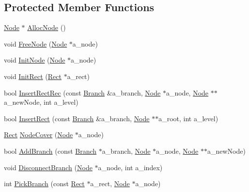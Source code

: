 \subsection*{Protected Member Functions}
\begin{DoxyCompactItemize}
\item 
\hyperlink{structRTree_1_1Node}{Node} $\ast$ \hyperlink{classRTree_af118b3fc992c88a61fb2e1ebc0c96fc9}{Alloc\-Node} ()
\item 
void \hyperlink{classRTree_a6b5438d9cb74dbfc63f3bfff275f506b}{Free\-Node} (\hyperlink{structRTree_1_1Node}{Node} $\ast$a\-\_\-node)
\item 
void \hyperlink{classRTree_aa24d93770aaa1042136daeabfdb8de3e}{Init\-Node} (\hyperlink{structRTree_1_1Node}{Node} $\ast$a\-\_\-node)
\item 
void \hyperlink{classRTree_aa065e71784e5cac81acd16c07c6abe5e}{Init\-Rect} (\hyperlink{structRTree_1_1Rect}{Rect} $\ast$a\-\_\-rect)
\item 
bool \hyperlink{classRTree_af8e10a4e616414ddf6c0ee40a6c95664}{Insert\-Rect\-Rec} (const \hyperlink{structRTree_1_1Branch}{Branch} \&a\-\_\-branch, \hyperlink{structRTree_1_1Node}{Node} $\ast$a\-\_\-node, \hyperlink{structRTree_1_1Node}{Node} $\ast$$\ast$a\-\_\-new\-Node, int a\-\_\-level)
\item 
bool \hyperlink{classRTree_a0a9b36fceaa83240e41d67b7665f6d3d}{Insert\-Rect} (const \hyperlink{structRTree_1_1Branch}{Branch} \&a\-\_\-branch, \hyperlink{structRTree_1_1Node}{Node} $\ast$$\ast$a\-\_\-root, int a\-\_\-level)
\item 
\hyperlink{structRTree_1_1Rect}{Rect} \hyperlink{classRTree_a19dc96034d7a3230ba877953247457e1}{Node\-Cover} (\hyperlink{structRTree_1_1Node}{Node} $\ast$a\-\_\-node)
\item 
bool \hyperlink{classRTree_a1028d814e1f54328cf58371ea4f9f9bf}{Add\-Branch} (const \hyperlink{structRTree_1_1Branch}{Branch} $\ast$a\-\_\-branch, \hyperlink{structRTree_1_1Node}{Node} $\ast$a\-\_\-node, \hyperlink{structRTree_1_1Node}{Node} $\ast$$\ast$a\-\_\-new\-Node)
\item 
void \hyperlink{classRTree_adcdcac926b2de35cc1f4f07e02b70bf6}{Disconnect\-Branch} (\hyperlink{structRTree_1_1Node}{Node} $\ast$a\-\_\-node, int a\-\_\-index)
\item 
int \hyperlink{classRTree_a142464629cd61c2541d6d0e0cc7d2d80}{Pick\-Branch} (const \hyperlink{structRTree_1_1Rect}{Rect} $\ast$a\-\_\-rect, \hyperlink{structRTree_1_1Node}{Node} $\ast$a\-\_\-node)
\item 
$$
\end{DoxyCompactItemize}
